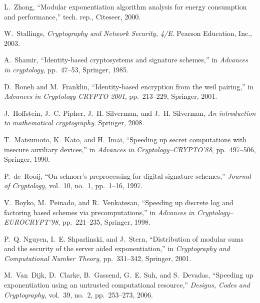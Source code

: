 \documentclass[english,draftcls,onecolumn,11pt]{IEEEtran}
\theoremstyle{definition}
\theoremstyle{plain}
\theoremstyle{plain}
\theoremstyle{definition}
\begin{document}
\begin{thebibliography}{10}
L.~Zhong, ``Modular exponentiation algorithm analysis for energy consumption
  and performance,'' tech. rep., Citeseer, 2000.

W.~Stallings, {\em Cryptography and Network Security, 4/E}.
\newblock Pearson Education, Inc., 2003.

A.~Shamir, ``Identity-based cryptosystems and signature schemes,'' in {\em
  Advances in cryptology}, pp.~47--53, Springer, 1985.

D.~Boneh and M.~Franklin, ``Identity-based encryption from the weil pairing,''
  in {\em Advances in Cryptology CRYPTO 2001}, pp.~213--229, Springer, 2001.

J.~Hoffstein, J.~C. Pipher, J.~H. Silverman, and J.~H. Silverman, {\em An
  introduction to mathematical cryptography}.
\newblock Springer, 2008.

T.~Matsumoto, K.~Kato, and H.~Imai, ``Speeding up secret computations with
  insecure auxiliary devices,'' in {\em Advances in Cryptology--CRYPTO'88},
  pp.~497--506, Springer, 1990.

P.~de~Rooij, ``On schnorr's preprocessing for digital signature schemes,'' {\em
  Journal of Cryptology}, vol.~10, no.~1, pp.~1--16, 1997.

V.~Boyko, M.~Peinado, and R.~Venkatesan, ``Speeding up discrete log and
  factoring based schemes via precomputations,'' in {\em Advances in
  Cryptology--EUROCRYPT'98}, pp.~221--235, Springer, 1998.

P.~Q. Nguyen, I.~E. Shparlinski, and J.~Stern, ``Distribution of modular sums
  and the security of the server aided exponentiation,'' in {\em Cryptography
  and Computational Number Theory}, pp.~331--342, Springer, 2001.

M.~Van~Dijk, D.~Clarke, B.~Gassend, G.~E. Suh, and S.~Devadas, ``Speeding up
  exponentiation using an untrusted computational resource,'' {\em Designs,
  Codes and Cryptography}, vol.~39, no.~2, pp.~253--273, 2006.

\end{thebibliography}
\end{document}
